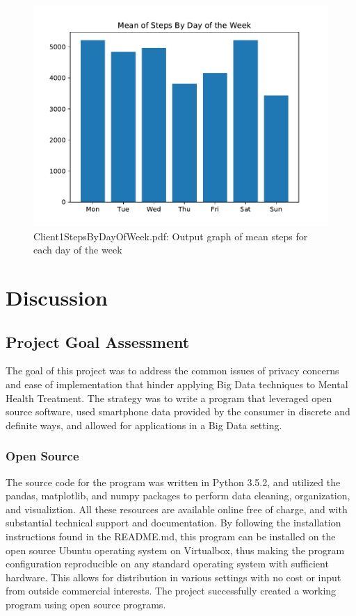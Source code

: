 \documentclass[sigconf]{acmart}
\begin{document}
\begin{figure}
\includegraphics{images/Client1StepsByDayOfWeek.pdf}
\caption{Client1StepsByDayOfWeek.pdf: Output graph of mean steps for each day of the week}
\end{figure}



\section{Discussion}

\subsection{Project Goal Assessment}

The goal of this project was to address the common issues of privacy concerns and ease of implementation that hinder applying Big Data techniques to Mental Health Treatment. The strategy was to write a program that leveraged open source software, used smartphone data provided by the consumer in discrete and definite ways, and allowed for applications in a Big Data setting.  

\subsubsection{Open Source}

The source code for the program was written in Python 3.5.2, and utilized the pandas, matplotlib, and numpy packages to perform data cleaning, organization, and visualiztion. All these resources are available online free of charge, and with substantial technical support and documentation. By following the installation instructions found in the README.md, this program can be installed on the open source Ubuntu operating system on Virtualbox, thus making the program configuration reproducible on any standard operating system with sufficient hardware. This allows for distribution in various settings with no cost or input from outside commercial interests. The project successfully created a working program using open source programs.
\end{document}
